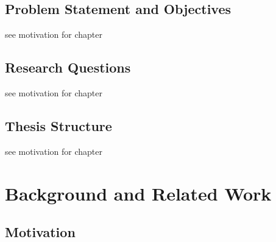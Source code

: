 \documentclass[
	bibliography=totoc,
	listof=totoc,
]{scrbook}
\begin{document}
\section{Problem Statement and Objectives} %


\begin{marker}\begin{justify}
see motivation for chapter
\end{justify}\end{marker}


\section{Research Questions} %


\begin{marker}\begin{justify}
see motivation for chapter
\end{justify}\end{marker}


\section{Thesis Structure} %


\begin{marker}\begin{justify}
see motivation for chapter
\end{justify}\end{marker}


\vfill\pagebreak %
\chapter{Background and Related Work} %
\section*{Motivation} %
\end{document}
